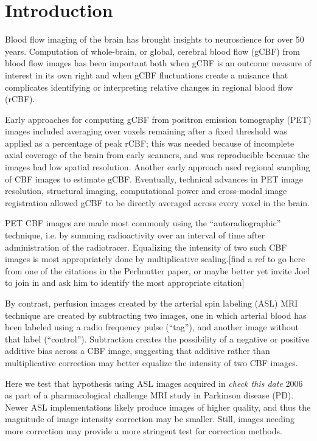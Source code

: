 \section{Introduction}
Blood flow imaging of the brain has brought insights to neuroscience for over 50 years.\cite{Taber_2005} Computation of whole-brain, or global, cerebral blood flow (gCBF) from blood flow images has been important both when gCBF is an outcome measure of interest in its own right and when gCBF fluctuations create a nuisance that complicates identifying or interpreting relative changes in regional blood flow (rCBF).\cite{Small_2004} 

Early approaches for computing gCBF from positron emission tomography (PET) images included averaging over voxels remaining after a fixed threshold was applied as a percentage of peak rCBF; this was needed because of incomplete axial coverage of the brain from early scanners, and was reproducible because the images had low spatial resolution.\cite{6609680} Another early approach used regional sampling of CBF images to estimate gCBF.\cite{6971299}\cite{Perlmutter_1985} Eventually, technical advances in PET image resolution, structural imaging, computational power and cross-modal image registration allowed gCBF to be directly averaged across every voxel in the brain.

PET CBF images are made most commonly using the ``autoradiographic'' technique, i.e. by summing radioactivity over an interval of time after administration of the radiotracer. Equalizing the intensity of two such CBF images is most appropriately done by multiplicative scaling.[find a ref to go here from one of the citations in the Perlmutter paper, or maybe better yet invite Joel to join in and ask him to identify the most appropriate citation] 

By contrast, perfusion images created by the arterial spin labeling (ASL) MRI technique are created by subtracting two images, one in which arterial blood has been labeled using a radio frequency pulse (``tag''), and another image without that label (``control''). Subtraction creates the possibility of a negative or positive additive bias across a CBF image, suggesting that additive rather than multiplicative correction may better equalize the intensity of two CBF images.

Here we test that hypothesis using ASL images acquired in \textit{check this date} 2006 as part of a pharmacological challenge MRI study in Parkinson disease (PD). Newer ASL implementations likely produce images of higher quality, and thus the magnitude of image intensity correction may be smaller. Still, images needing more correction may provide a more stringent test for correction methods.